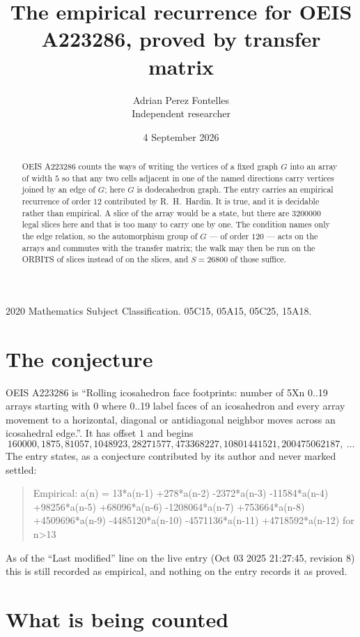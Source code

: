\documentclass[11pt,a4paper]{article}
\title{The empirical recurrence for OEIS A223286, proved by transfer matrix}
\author{Adrian Perez Fontelles\\ \small Independent researcher}
\date{4 September 2026}
\theoremstyle{plain}
\theoremstyle{definition}
\begin{document}
\maketitle

\begin{abstract}
OEIS A223286 counts the ways of writing the vertices of a fixed graph $G$ into an array of width
$5$ so that any two cells adjacent in one of the named directions carry vertices joined by an
edge of $G$; here $G$ is dodecahedron graph. The entry carries an empirical recurrence of order $12$
contributed by R.~H.~Hardin. It is true, and it is decidable rather than empirical. A slice of
the array would be a state, but there are $3200000$ legal slices here and that is too many to
carry one by one. The condition names only the edge relation, so the automorphism group of $G$
--- of order $120$ --- acts on the arrays and commutes with the transfer matrix; the walk may
then be run on the ORBITS of slices instead of on the slices, and $S=26800$ of those suffice.
\end{abstract}

\noindent\small 2020 Mathematics Subject Classification. 05C15, 05A15, 05C25, 15A18.\normalsize

\section{The conjecture}

OEIS A223286 is ``Rolling icosahedron face footprints: number of 5Xn 0..19 arrays starting with 0 where 0..19 label faces of an icosahedron and every array movement to a horizontal, diagonal or antidiagonal neighbor moves across an icosahedral edge.''. It has offset $1$ and begins
\[
160000, 1875, 81057, 1048923, 28271577, 473368227, 10801441521, 200475062187,\ \dots
\]
The entry states, as a conjecture contributed by its author and never marked settled:
\begin{quote}
Empirical: a(n) = 13*a(n-1) +278*a(n-2) -2372*a(n-3) -11584*a(n-4) +98256*a(n-5) +68096*a(n-6) -1208064*a(n-7) +753664*a(n-8) +4509696*a(n-9) -4485120*a(n-10) -4571136*a(n-11) +4718592*a(n-12) for n>13
\end{quote}
As of the ``Last modified'' line on the live entry (Oct 03 2025 21:27:45, revision 8) this is still
recorded as empirical, and nothing on the entry records it as proved.

\section{What is being counted}
\end{document}
